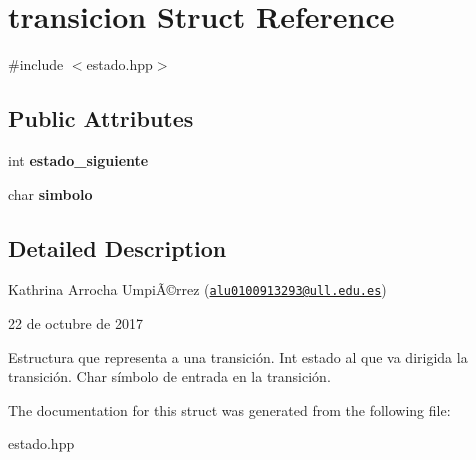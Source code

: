 \hypertarget{structtransicion}{\section{transicion Struct Reference}
\label{structtransicion}
}


{\ttfamily \#include $<$estado.\-hpp$>$}

\subsection*{Public Attributes}
\begin{DoxyCompactItemize}
\item 
\hypertarget{structtransicion_aab8448a756f2c0d24a451a0da057d42e}{int {\bfseries estado\-\_\-siguiente}}\label{structtransicion_aab8448a756f2c0d24a451a0da057d42e}

\item 
\hypertarget{structtransicion_a27058a2ed163e3340cca81a991a03166}{char {\bfseries simbolo}}\label{structtransicion_a27058a2ed163e3340cca81a991a03166}

\end{DoxyCompactItemize}


\subsection{Detailed Description}
Kathrina Arrocha UmpiÃ©rrez (\href{mailto:alu0100913293@ull.edu.es}{\tt alu0100913293@ull.\-edu.\-es})

22 de octubre de 2017

Estructura que representa a una transición.  Int estado al que va dirigida la transición.  Char símbolo de entrada en la transición. 

The documentation for this struct was generated from the following file\-:\begin{DoxyCompactItemize}
\item 
estado.\-hpp\end{DoxyCompactItemize}
